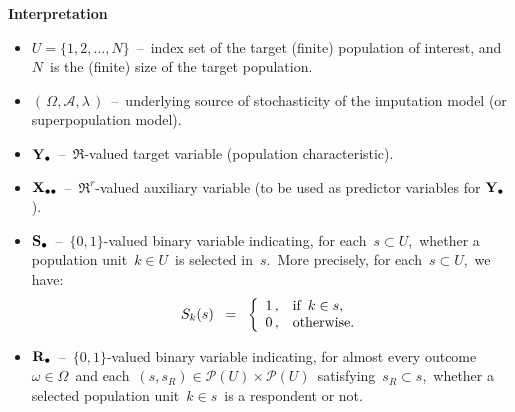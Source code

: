 \vskip 0.2cm
\noindent
\textbf{Interpretation}
\begin{itemize}
\item
    $U = \{1,2,\ldots,N\}$
    \,--\,
    index set of the target (finite) population of interest,
    and \,$N$\, is the (finite) size of the target population.
\item
    $\left(\,\Omega,\mathscr{A},\lambda\,\right)$
    \,--\,
    underlying source of stochasticity of the imputation model (or superpopulation model).
\item
    $\mathbf{Y}_{\bullet}$
    \,--\,
    $\Re$-valued target variable (population characteristic).
\item
    $\mathbf{X}_{\bullet\bullet}$
    \,--\,
    $\Re^{r}$-valued auxiliary variable (to be used as predictor variables for $\mathbf{Y}_{\bullet}$). 
\item
    $\mathbf{S}_{\bullet}$
    \,--\,
    $\{0,1\}$-valued binary variable indicating, for each \,$s \subset U$,\,
    whether a population unit \,$k \in U$\, is selected in \,$s$.\,
    More precisely, for each \,$s \subset U$,\, we have:
    \begin{equation*}
    S_{k}(s)
    \;\; = \;\;
        \left\{\begin{array}{cl}
            1\,, & \textnormal{if \,$k \in s$},
            \\
            0\,, & \textnormal{otherwise}.
            \end{array}\right.
    \end{equation*}
\item
    $\mathbf{R}_{\bullet}$
    \,--\,
    $\{0,1\}$-valued binary variable indicating, for almost every outcome
    \,$\omega \in \Omega$\,
    and each
    \,$(s,s_{R}) \in \mathcal{P}(U) \times \mathcal{P}(U)$\,
    satisfying
    \,$s_{R} \subset s$,\,
    whether a selected population unit \,$ k \in s$\,
    is a respondent or not.
\end{itemize}

